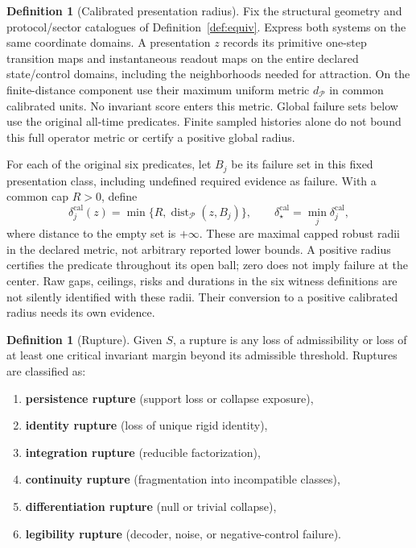 \documentclass[11pt,a4paper]{article}
\theoremstyle{definition}
\newtheorem{definition}[theorem]{Definition}
\begin{document}
\begin{definition}[Calibrated presentation radius]\label{def:transport-calibration}
Fix the structural geometry and protocol/sector catalogues of Definition~\ref{def:equiv}. Express both systems on the same coordinate domains. A presentation $z$ records its primitive one-step transition maps and instantaneous readout maps on the entire declared state/control domains, including the neighborhoods needed for attraction. On the finite-distance component use their maximum uniform metric $d_{\mathcal P}$ in common calibrated units. No invariant score enters this metric. Global failure sets below use the original all-time predicates. Finite sampled histories alone do not bound this full operator metric or certify a positive global radius.

For each of the original six predicates, let $B_j$ be its failure set in this fixed presentation class, including undefined required evidence as failure. With a common cap $R>0$, define
\[
 \delta_j^{\mathrm{cal}}(z)=\min\{R,\operatorname{dist}_{\mathcal P}(z,B_j)\},\qquad
 \delta_\star^{\mathrm{cal}}=\min_j\delta_j^{\mathrm{cal}},
\]
where distance to the empty set is $+\infty$. These are maximal capped robust radii in the declared metric, not arbitrary reported lower bounds. A positive radius certifies the predicate throughout its open ball; zero does not imply failure at the center. Raw gaps, ceilings, risks and durations in the six witness definitions are not silently identified with these radii. Their conversion to a positive calibrated radius needs its own evidence.
\end{definition}

\begin{definition}[Rupture]\label{def:rupture}
Given $S$, a rupture is any loss of admissibility or loss of at least one critical invariant margin beyond its admissible threshold. Ruptures are classified as:
\begin{enumerate}[leftmargin=1.5em]
\item \textbf{persistence rupture} (support loss or collapse exposure),
\item \textbf{identity rupture} (loss of unique rigid identity),
\item \textbf{integration rupture} (reducible factorization),
\item \textbf{continuity rupture} (fragmentation into incompatible classes),
\item \textbf{differentiation rupture} (null or trivial collapse),
\item \textbf{legibility rupture} (decoder, noise, or negative-control failure).
\end{enumerate}
\end{definition}
\end{document}
